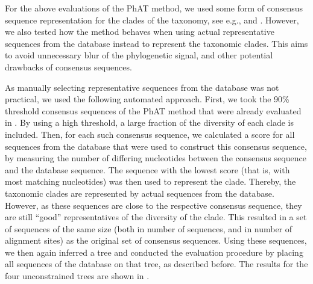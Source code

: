 For the above evaluations of the \ac{PhAT} method,
we used some form of consensus sequence representation for the clades of the taxonomy,
see e.g.,  and .
However, we also tested how the method behaves when using actual representative sequences from the database instead
to represent the taxonomic clades.
This aims to avoid unnecessary blur of the phylogenetic signal, and other potential drawbacks of consensus sequences.

As manually selecting representative sequences from the database was not practical,
we used the following automated approach.
First, we took the 90\% threshold consensus sequences of the \ac{PhAT} method
that were already evaluated in .
By using a high threshold, a large fraction of the diversity of each clade is included.
Then, for each such consensus sequence,
we calculated a score for all sequences from the database that were used to construct this consensus sequence,
by measuring the number of differing nucleotides between the consensus sequence and the database sequence.
The sequence with the lowest score (that is, with most matching nucleotides)
was then used to represent the clade.
Thereby, the taxonomic clades are represented by actual sequences from the database.
However, as these sequences are close to the respective consensus sequence,
they are still ``good'' representatives of the diversity of the clade.
This resulted in a set of sequences of the same size (both in number of sequences, and in number of alignment sites) 
as the original set of consensus sequences.
Using these sequences, we then again inferred a tree and
conducted the evaluation procedure by placing all sequences of the database on that tree,
as described before.
The results for the four unconstrained trees are shown in .

